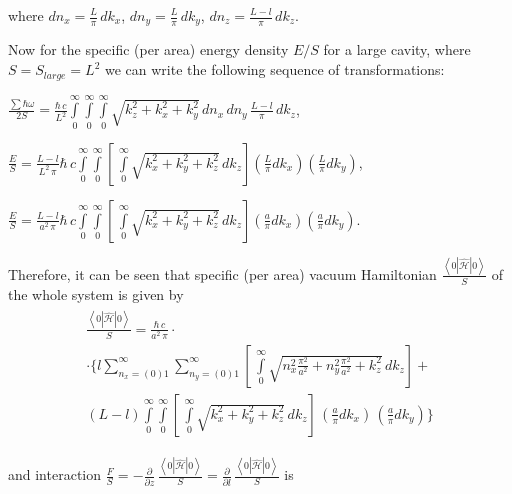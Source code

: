 \documentclass[twoside, 10pt, ptm]{article}
\begin{document}
\begin{multicols}{2}
where \(dn_x = \frac{L}{\pi}\,dk_x\), \(dn_y = \frac{L}{\pi}\,dk_y\),
\(dn_z = \frac{L-l}{\pi}\,dk_z\).

    Now for the specific (per area) energy density \(E/S\) for a large cavity, where
\(S = S_{large} = L^2\) we can write the following sequence of transformations:

\noindent
\(\frac{\sum\hbar\omega}{2 S} = \frac{\hbar\,c}{L^2}\int\limits_{0}^{\infty}\int\limits_{0}^{\infty}\int\limits_{0}^{\infty}\sqrt{k_z^2+k_x^2+k_y^2}\,dn_x\,dn_y\,\frac{L-l}{\pi}\,dk_z\),


\noindent
\(\frac{E}{S} = \frac{L-l}{L^2\,\pi}\hbar\,c\int\limits_{0}^{\infty}\int\limits_{0}^{\infty}\left[\,\int\limits_{0}^{\infty}\sqrt{k_x^2+k_y^2+k_z^2}\,dk_z\right] \left(\frac{L}{\pi}dk_x\right) \left(\frac{L}{\pi}dk_y\right)\),

\noindent
\(\frac{E}{S} = \frac{L-l}{a^2\,\pi}\hbar\,c\int\limits_{0}^{\infty}\int\limits_{0}^{\infty}\left[\,\int\limits_{0}^{\infty}\sqrt{k_x^2+k_y^2+k_z^2}\,dk_z\right] \left(\frac{a}{\pi}dk_x\right) \left(\frac{a}{\pi}dk_y\right)\).

    Therefore, it can be seen that specific (per area) vacuum Hamiltonian
\(\frac{\left<0|\hat{\mathcal{H}}|0\right>}{S}\) of the whole system is
given by
\noindent
\[\begin{array}{lr}
\begin{array}{l}
\frac{\left<0|\hat{\mathcal{H}}|0\right>}{S} = \frac{\hbar\,c}{a^2\,\pi} \cdot\\
\cdot \Bigg\{l\sum\limits_{n_x=(0)1}^{\infty}\sum\limits_{n_y=(0)1}^{\infty}\left[\,\int\limits_{0}^{\infty}\sqrt{n_x^2\frac{\pi^2}{a^2}+n_y^2\frac{\pi^2}{a^2}+k_z^2}\,dk_z\right] + \\
(L-l)\int\limits_{0}^{\infty}\int\limits_{0}^{\infty}\left[\,\int\limits_{0}^{\infty}\sqrt{k_x^2+k_y^2+k_z^2}\,dk_z\right]\,\left(\frac{a}{\pi}dk_x\right)\,\left(\frac{a}{\pi}dk_y\right)\Bigg\}
\end{array}\end{array}\]

and interaction
\(\frac{F}{S} = -\frac{\partial }{\partial z} \,\frac{\left<0|\hat{\mathcal{H}}|0\right>}{S} = \frac{\partial}{\partial l} \,\frac{\left<0|\hat{\mathcal{H}}|0\right>}{S}\)
is

\end{multicols}
\end{document}
